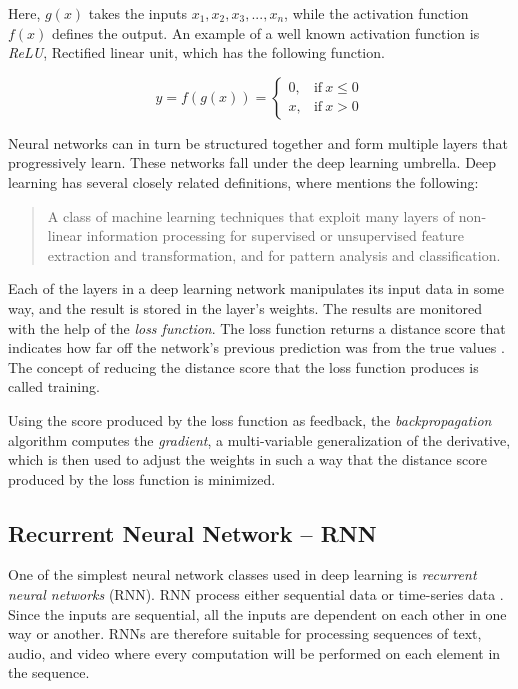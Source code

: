 \documentclass[nofilelist]{cslthse-msc}
\begin{document}
Here, $g(x)$ takes the inputs $x_1, x_2, x_3,...,x_n$, while the activation function $f(x)$ defines the output. An example of a well known activation function is \textit{ReLU}, Rectified linear unit, which has the following function. 

\begin{equation}
y = f(g(x)) =
\begin{cases}
  0, & \text{if}\ x \leq 0 \\
  x, & \text{if}\ x > 0
\end{cases}
\end{equation}

Neural networks can in turn be structured together and form multiple layers that progressively learn. These networks fall under the deep learning umbrella. Deep learning has several closely related definitions, where \citet{deng2014deep} mentions the following:

\begin{quote}{A class of machine learning techniques that exploit many layers of non-linear information processing for supervised or unsupervised feature extraction and transformation, and for pattern analysis and classification.}
\end{quote}

Each of the layers in a deep learning network manipulates its input data in some way, and the result is stored in the layer's weights. The results are monitored with the help of the \textit{loss function}. The loss function returns a distance score that indicates how far off the network's previous prediction was from the true values \citep{franoischollet2017learning}. The concept of reducing the distance score that the loss function produces is called training.

Using the score produced by the loss function as feedback, the \textit{backpropagation} algorithm computes the \textit{gradient}, a multi-variable generalization of the derivative, which is then used to adjust the weights in such a way that the distance score produced by the loss function is minimized. 


\subsection{Recurrent Neural Network -- RNN}

One of the simplest neural network classes used in deep learning is \emph{recurrent neural networks} (RNN). RNN process either sequential data or time-series data \citep{lipton2015critical}. Since the inputs are sequential, all the inputs are dependent on each other in one way or another. RNNs are therefore suitable for processing sequences of text, audio, and video where every computation will be performed on each element in the sequence.
\end{document}
